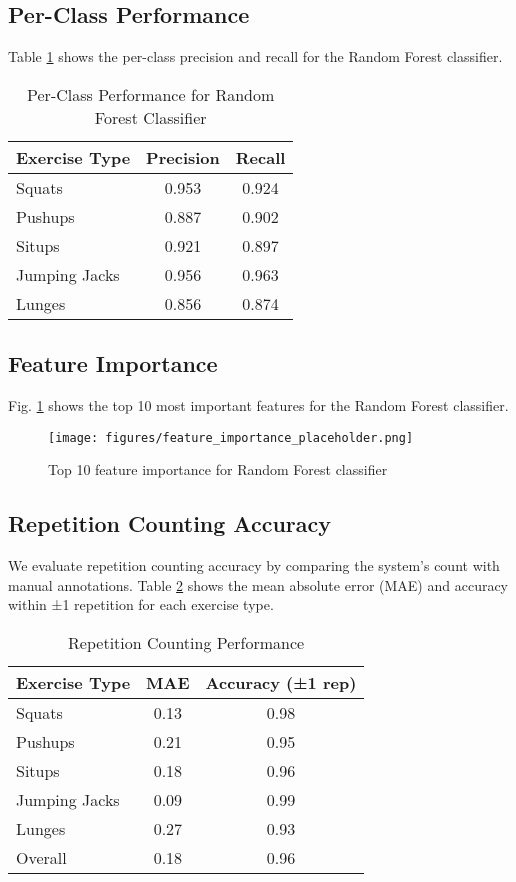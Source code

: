 \documentclass[conference]{IEEEtran}
\begin{document}
\subsection{Per-Class Performance}
Table \ref{tab:per_class} shows the per-class precision and recall for the Random Forest classifier.

\begin{table}[htbp]
\centering
\caption{Per-Class Performance for Random Forest Classifier}
\label{tab:per_class}
\begin{tabular}{@{}lcc@{}}
\toprule
\textbf{Exercise Type} & \textbf{Precision} & \textbf{Recall} \\
\midrule
Squats & 0.953 & 0.924 \\
Pushups & 0.887 & 0.902 \\
Situps & 0.921 & 0.897 \\
Jumping Jacks & 0.956 & 0.963 \\
Lunges & 0.856 & 0.874 \\
\bottomrule
\end{tabular}
\end{table}

\subsection{Feature Importance}
Fig. \ref{fig:feature_importance} shows the top 10 most important features for the Random Forest classifier.

\begin{figure}[htbp]
\centering
\texttt{[image: figures/feature\_importance\_placeholder.png]}
\caption{Top 10 feature importance for Random Forest classifier}
\label{fig:feature_importance}
\end{figure}

\subsection{Repetition Counting Accuracy}
We evaluate repetition counting accuracy by comparing the system's count with manual annotations. Table \ref{tab:rep_counting} shows the mean absolute error (MAE) and accuracy within ±1 repetition for each exercise type.

\begin{table}[htbp]
\centering
\caption{Repetition Counting Performance}
\label{tab:rep_counting}
\begin{tabular}{@{}lcc@{}}
\toprule
\textbf{Exercise Type} & \textbf{MAE} & \textbf{Accuracy (±1 rep)} \\
\midrule
Squats & 0.13 & 0.98 \\
Pushups & 0.21 & 0.95 \\
Situps & 0.18 & 0.96 \\
Jumping Jacks & 0.09 & 0.99 \\
Lunges & 0.27 & 0.93 \\
\midrule
Overall & 0.18 & 0.96 \\
\bottomrule
\end{tabular}
\end{table}
\end{document}
